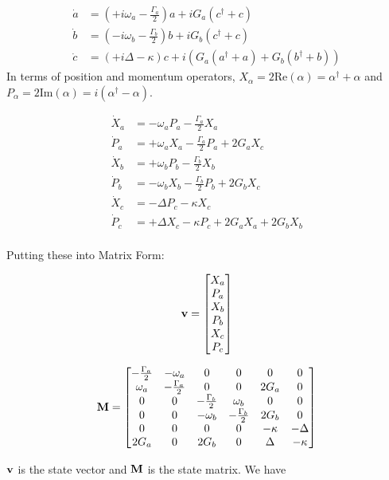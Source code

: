 \documentclass[12pt]{article}
\newcommand{\bv}[1]{\bold{#1}}
\begin{document}
\begin{align*}
\dot{a} &= \left(+i \omega_a - \frac{\Gamma_a}{2}\right)a + i G_a(c^{\dag} +c)\\
\dot{b}&= \left(-i \omega_b - \frac{\Gamma_b}{2}\right)b + i G_b(c^{\dag} +c)\\
\dot{c}&= \left(+i \Delta - \kappa\right) c + i(G_a(a^{\dag}+a)+G_b(b^{\dag}+b))
\end{align*}
In terms of position and momentum operators, $X_{\alpha} = 2\text{Re}(\alpha) = \alpha^{\dag}+\alpha$ and $P_{\alpha} = 2\text{Im}(\alpha) = i(\alpha^{\dag}-\alpha)$.

\begin{align*}
\dot{X}_a &= -\omega_a P_a -\frac{\Gamma_a}{2} X_a\\
\dot{P}_a &= +\omega_a X_a -\frac{\Gamma_a}{2} P_a + 2 G_a X_c\\
\dot{X}_b &= +\omega_b P_b -\frac{\Gamma_b}{2} X_b\\
\dot{P}_b &= -\omega_b X_b -\frac{\Gamma_b}{2} P_b + 2 G_b X_c\\
\dot{X}_c &= -\Delta P_c - \kappa X_c\\
\dot{P}_c &= +\Delta X_c - \kappa P_c + 2 G_a X_a + 2 G_b X_b\\
\end{align*}

Putting these into Matrix Form:

\[ \bv{v} = \begin{bmatrix}
X_a\\P_a\\X_b\\P_b\\X_c\\P_c \end{bmatrix} \]

\[ \bv{M} = \begin{bmatrix}
-\frac{\Gamma_a}{2} & -\omega_a & 0 & 0 & 0 & 0 \\
\omega_a & -\frac{\Gamma_a}{2} & 0 & 0 & 2G_a & 0 \\
0 & 0 & -\frac{\Gamma_b}{2} & \omega_b & 0 & 0 \\
0 & 0 & -\omega_b & -\frac{\Gamma_b}{2} & 2G_b & 0\\
0 & 0 & 0 & 0 & -\kappa & -\Delta \\
2G_a & 0 & 2G_b & 0 & \Delta & -\kappa \\ \end{bmatrix}\]

$\bv{v}$ is the state vector and $\bv{M}$ is the state matrix. We have
\end{document}
